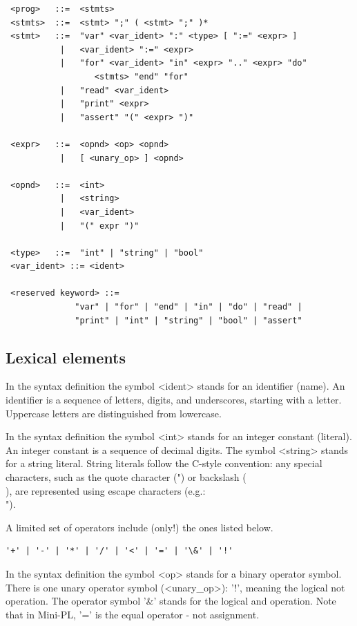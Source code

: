 \documentclass{article}
\begin{document}
\begin{verbatim}
 <prog>   ::=  <stmts>
 <stmts>  ::=  <stmt> ";" ( <stmt> ";" )*
 <stmt>   ::=  "var" <var_ident> ":" <type> [ ":=" <expr> ]
           |   <var_ident> ":=" <expr>
           |   "for" <var_ident> "in" <expr> ".." <expr> "do"
                  <stmts> "end" "for"
           |   "read" <var_ident>
           |   "print" <expr>
           |   "assert" "(" <expr> ")"

 <expr>   ::=  <opnd> <op> <opnd>
           |   [ <unary_op> ] <opnd>

 <opnd>   ::=  <int>
           |   <string>
           |   <var_ident>
           |   "(" expr ")"

 <type>   ::=  "int" | "string" | "bool"
 <var_ident> ::= <ident>

 <reserved keyword> ::=
              "var" | "for" | "end" | "in" | "do" | "read" |
              "print" | "int" | "string" | "bool" | "assert"
\end{verbatim}
\subsection{Lexical elements}

In the syntax definition the symbol <ident> stands for an identifier (name). An
identifier is a sequence of letters, digits, and underscores, starting with a
letter. Uppercase letters are distinguished from lowercase.

In the syntax definition the symbol <int> stands for an integer constant
(literal). An integer constant is a sequence of decimal digits. The symbol
<string> stands for a string literal. String literals follow the C-style
convention: any special characters, such as the quote character (") or
backslash (\\), are represented using escape characters (e.g.: \\").

A limited set of operators include (only!) the ones listed below.

\begin{verbatim}
'+' | '-' | '*' | '/' | '<' | '=' | '\&' | '!'
\end{verbatim}

In the syntax definition the symbol <op> stands for a binary operator symbol.
There is one unary operator symbol (<unary\_op>): '!', meaning the logical not
operation. The operator symbol '\&' stands for the logical and operation. Note
that in Mini-PL, '=' is the equal operator - not assignment.
\end{document}
